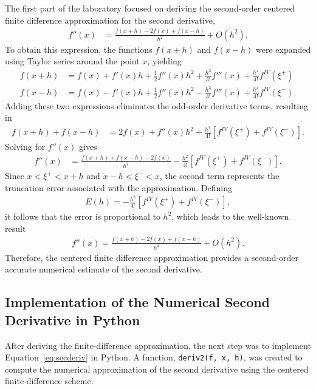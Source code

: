 \documentclass[../portafolio.tex]{subfiles}
\begin{document}
The first part of the laboratory focused on deriving the second-order centered finite difference approximation for the second derivative,
\begin{align}
f''(x) &= \frac{f(x+h)-2f(x)+f(x-h)}{h^2} + O(h^2).
\label{eq:secderiv}
\end{align}
To obtain this expression, the functions $f(x+h)$ and $f(x-h)$ were expanded using Taylor series around the point $x$, yielding
\begin{align}
f(x+h) &= f(x) + f'(x)h + \frac{1}{2}f''(x)h^2 + \frac{h^3}{3!}f'''(x) + \frac{h^4}{4!}f^{IV}(\xi^+)
\label{eq:derivadel}
\\
f(x-h) &= f(x) - f'(x)h + \frac{1}{2}f''(x)h^2 - \frac{h^3}{3!}f'''(x) + \frac{h^4}{4!}f^{IV}(\xi^-).
\label{eq:derivret}
\end{align}
Adding these two expressions eliminates the odd-order derivative terms, resulting in
\begin{align*}
f(x+h)+f(x-h)
&=
2f(x)
+
f''(x)h^2
+
\frac{h^4}{4!}
\left[
f^{IV}(\xi^+)
+
f^{IV}(\xi^-)
\right].
\end{align*}
Solving for $f''(x)$ gives
\begin{align*}
f''(x)
&= \frac{f(x+h)+f(x-h)-2f(x)}{h^2} - \frac{h^2}{4!}
\left[
f^{IV}(\xi^+)
+
f^{IV}(\xi^-)
\right].
\end{align*}
Since $x < \xi^+ < x+h$ and $x-h < \xi^- < x$, the second term represents the truncation error associated with the approximation. Defining
\begin{align*}
E(h)
=
-\frac{h^2}{4!}
\left[
f^{IV}(\xi^+)
+
f^{IV}(\xi^-)
\right],
\end{align*}
it follows that the error is proportional to $h^2$, which leads to the well-known result
\begin{align*}
f''(x)
=
\frac{f(x+h)-2f(x)+f(x-h)}{h^2}
+
O(h^2).
\end{align*}
Therefore, the centered finite difference approximation provides a second-order accurate numerical estimate of the second derivative.

\subsection{Implementation of the Numerical Second Derivative in Python}

After deriving the finite-difference approximation, the next step was to implement Equation~\ref{eq:secderiv} in Python. A function, \texttt{deriv2(f, x, h)}, was created to compute the numerical approximation of the second derivative using the centered finite-difference scheme.
\end{document}
